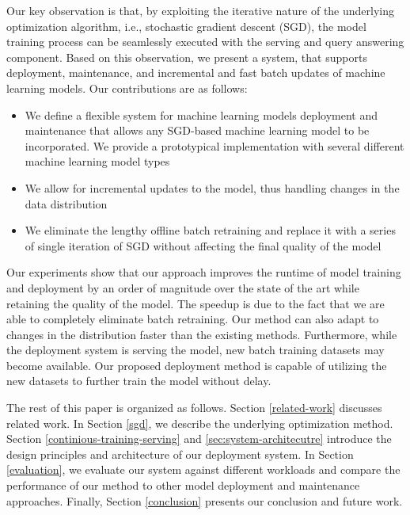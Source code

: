 \documentclass{vldb}
\begin{document}
Our key observation is that, by exploiting the iterative nature of the underlying optimization algorithm, i.e., stochastic gradient descent (SGD), the model training process can be seamlessly executed with the serving and query answering component.
Based on this observation, we present a system, that supports deployment, maintenance, and incremental and fast batch updates of machine learning models.
Our contributions are as follows:
\begin{itemize}
\item We define a flexible system for machine learning models deployment and maintenance that allows any SGD-based machine learning model to be incorporated. We provide a prototypical implementation with several different machine learning model types
\item We allow for incremental updates to the model, thus handling changes in the data distribution
\item We eliminate the lengthy offline batch retraining and replace it with a series of single iteration of SGD without affecting the final quality of the model
\end{itemize}
Our experiments show that our approach improves the runtime of model training and deployment by an order of magnitude over the state of the art while retaining the quality of the model. 
The speedup is due to the fact that we are able to completely eliminate batch retraining. 
Our method can also adapt to changes in the distribution faster than the existing methods.
Furthermore, while the deployment system is serving the model, new batch training datasets may become available.
Our proposed deployment method is capable of utilizing the new datasets to further train the model without delay.

The rest of this paper is organized as follows. 
Section \ref {related-work} discusses related work.
In Section \ref{sgd}, we describe the underlying optimization method.
Section \ref{continious-training-serving} and \ref{sec:system-architecutre} introduce the design principles and architecture of our deployment system.
In Section \ref{evaluation}, we evaluate our system against different workloads and compare the performance of our method to other model deployment and maintenance approaches. 
Finally, Section \ref{conclusion} presents our conclusion and future work.
\end{document}

